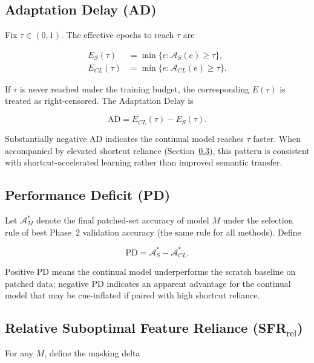 \documentclass[conference]{IEEEtran}
\begin{document}
\subsection{Adaptation Delay (AD)}
Fix \(\tau\in(0,1)\). The effective epochs to reach \(\tau\) are

\begin{align}
E_S(\tau) &= \min\{e:\mathcal{A}_S(e)\ge\tau\}, \label{eq:es_tau}\\
E_{CL}(\tau) &= \min\{e:\mathcal{A}_{CL}(e)\ge\tau\}. \label{eq:ecl_tau}
\end{align}

If \(\tau\) is never reached under the training budget, the corresponding \(E(\tau)\) is treated as right-censored. The Adaptation Delay is

\begin{equation}
\mathrm{AD} = E_{CL}(\tau)-E_S(\tau).
\label{eq:ad}
\end{equation}

Substantially negative \(\mathrm{AD}\) indicates the continual model reaches \(\tau\) faster. When accompanied by elevated shortcut reliance (Section~\ref{ssec:sfr}), this pattern is consistent with shortcut-accelerated learning rather than improved semantic transfer.

\subsection{Performance Deficit (PD)}
Let \(\mathcal{A}_M^*\) denote the final patched-set accuracy of model \(M\) under the selection rule of best Phase~2 validation accuracy (the same rule for all methods). Define

\begin{equation}
\mathrm{PD} = \mathcal{A}_S^*-\mathcal{A}_{CL}^*.
\label{eq:pd}
\end{equation}

Positive \(\mathrm{PD}\) means the continual model underperforms the scratch baseline on patched data; negative \(\mathrm{PD}\) indicates an apparent advantage for the continual model that may be cue-inflated if paired with high shortcut reliance.

\subsection{Relative Suboptimal Feature Reliance (SFR\(_{\mathrm{rel}}\))}
\label{ssec:sfr}

For any \(M\), define the masking delta
\end{document}
